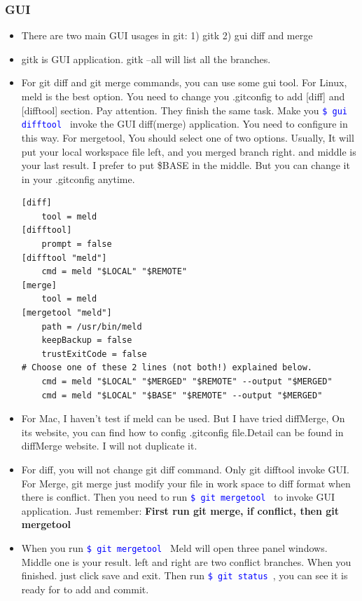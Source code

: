 \documentclass[a4paper,12pt,twoside]{book}
\newcommand{\linuxcommand}[1]{\texttt{\textcolor{blue}{\$ #1 \Pisymbol{psy}{191}}}}
\begin{document}
\subsubsection{GUI}
\begin{itemize}
	\item There are two main GUI usages in git: 1) gitk 2) gui diff and merge    

    \item gitk is GUI application. gitk --all will list all the branches.

    \item For git diff and git merge commands, you can use some gui tool. For Linux, meld is the best option. You need to change you .gitconfig to add [diff] and [difftool] section. Pay attention. They finish the same task. Make you \linuxcommand{gui difftool} invoke the GUI diff(merge) application. You need to configure in this way. For mergetool, You should select one of two options. Usually, It will put your local workspace file left, and you merged branch right. and middle is your last result. I prefer to put \$BASE in the middle. But you can change it in your .gitconfig anytime. 
\begin{verbatim}
[diff]
    tool = meld
[difftool]
	prompt = false
[difftool "meld"]
	cmd = meld "$LOCAL" "$REMOTE"
[merge]
    tool = meld
[mergetool "meld"]
	path = /usr/bin/meld
	keepBackup = false
	trustExitCode = false	
# Choose one of these 2 lines (not both!) explained below.
	cmd = meld "$LOCAL" "$MERGED" "$REMOTE" --output "$MERGED"
    cmd = meld "$LOCAL" "$BASE" "$REMOTE" --output "$MERGED"
\end{verbatim}
       
      \item For Mac, I haven't test if meld can be used. But I have tried diffMerge, On its website, you can find how to config .gitconfig file.Detail can be found in diffMerge website. I will not duplicate it.

      \item For diff, you will not change git diff command. Only git difftool invoke GUI. For Merge, git merge just modify your file in work space to diff format when there is conflict. Then you need to run \linuxcommand{git mergetool} to invoke GUI application.  Just remember: \textbf{First run git merge, if conflict, then git mergetool}

\item When you run \linuxcommand{git mergetool} Meld will open three panel windows. Middle one is your result. left and right are two conflict branches.  When you finished. just click save and exit. Then run \linuxcommand{git status}, you can see it is ready for to add and commit. 
 
\end{itemize}
\end{document}
